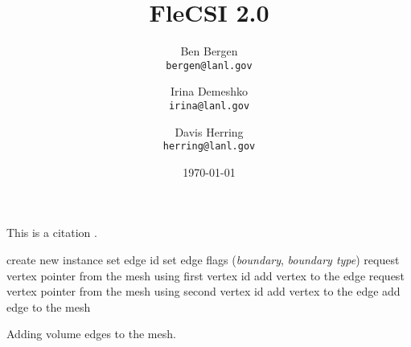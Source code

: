 \documentclass{article}
\title{FleCSI 2.0}
\author{
  Ben Bergen\\
  \texttt{bergen@lanl.gov}
  \and
  Irina Demeshko\\
  \texttt{irina@lanl.gov}
  \and
  Davis Herring\\
  \texttt{herring@lanl.gov}
}
\date{\today}
\begin{document}
\maketitle




This is a citation \cite{LegionSC12}.





\begin{algorithm}
  \begin{algorithmic}[1]
    \STATE create new instance
    \STATE set edge id
    \STATE set edge flags (\emph{boundary}, \emph{boundary type})
    \STATE request vertex pointer from the mesh using first vertex id
    \STATE add vertex to the edge
    \STATE request vertex pointer from the mesh using second vertex id
    \STATE add vertex to the edge
    \STATE add edge to the mesh
    \ENDFOR
  \end{algorithmic}
  \caption{Adding volume edges to the mesh.}
  \label{algo:volume_edge_assembly}
\end{algorithm}



\end{document}
